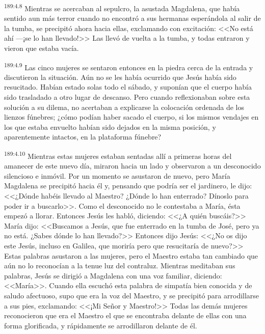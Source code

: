 \par 
\textsuperscript{189:4.8} Mientras se acercaban al sepulcro, la asustada Magdalena, que había sentido aun más terror cuando no encontró a sus hermanas esperándola al salir de la tumba, se precipitó ahora hacia ellas, exclamando con excitación: <<No está ahí ---¡se lo han llevado!>> Las llevó de vuelta a la tumba, y todas entraron y vieron que estaba vacía.

\par 
\textsuperscript{189:4.9} Las cinco mujeres se sentaron entonces en la piedra cerca de la entrada y discutieron la situación. Aún no se les había ocurrido que Jesús había sido resucitado. Habían estado solas todo el sábado, y suponían que el cuerpo había sido trasladado a otro lugar de descanso. Pero cuando reflexionaban sobre esta solución a su dilema, no acertaban a explicarse la colocación ordenada de los lienzos fúnebres; ¿cómo podían haber sacado el cuerpo, si los mismos vendajes en los que estaba envuelto habían sido dejados en la misma posición, y aparentemente intactos, en la plataforma fúnebre?

\par 
\textsuperscript{189:4.10} Mientras estas mujeres estaban sentadas allí a primeras horas del amanecer de este nuevo día, miraron hacia un lado y observaron a un desconocido silencioso e inmóvil. Por un momento se asustaron de nuevo, pero María Magdalena se precipitó hacia él y, pensando que podría ser el jardinero, le dijo: <<¿Dónde habéis llevado al Maestro? ¿Dónde lo han enterrado? Dínoslo para poder ir a buscarlo>>. Como el desconocido no le contestaba a María, ésta empezó a llorar. Entonces Jesús les habló, diciendo: <<¿A quién buscáis?>> María dijo: <<Buscamos a Jesús, que fue enterrado en la tumba de José, pero ya no está. ¿Sabes dónde lo han llevado?>> Entonces dijo Jesús: <<¿No os dijo este Jesús, incluso en Galilea, que moriría pero que resucitaría de nuevo?>> Estas palabras asustaron a las mujeres, pero el Maestro estaba tan cambiado que aún no lo reconocían a la tenue luz del contraluz. Mientras meditaban sus palabras, Jesús se dirigió a Magdalena con una voz familiar, diciendo: <<María>>. Cuando ella escuchó esta palabra de simpatía bien conocida y de saludo afectuoso, supo que era la voz del Maestro, y se precipitó para arrodillarse a sus pies, exclamando: <<¡Mi Señor y Maestro!>> Todas las demás mujeres reconocieron que era el Maestro el que se encontraba delante de ellas con una forma glorificada, y rápidamente se arrodillaron delante de él.

